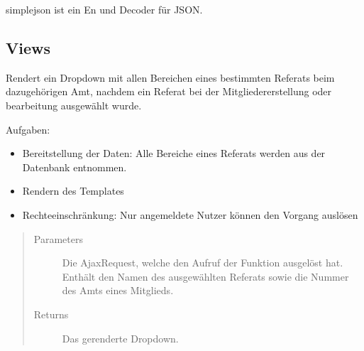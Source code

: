 \documentclass[letterpaper,10pt,english]{sphinxmanual}
\begin{document}
simplejson ist ein En\sphinxhyphen{} und Decoder für JSON.


\subsection{Views}
\label{\detokenize{masterCodeDoc:id6}}\label{\detokenize{masterCodeDoc:module-mitglieder.views}}

\begin{fulllineitems}
\label{\detokenize{masterCodeDoc:mitglieder.views.bereiche_laden}}
Rendert ein Dropdown mit allen Bereichen eines bestimmten Referats beim dazugehörigen Amt, nachdem ein Referat bei der Mitgliedererstellung oder \sphinxhyphen{}bearbeitung ausgewählt wurde.

Aufgaben:
\begin{itemize}
\item {} 
Bereitstellung der Daten: Alle Bereiche eines Referats werden aus der Datenbank entnommen.

\item {} 
Rendern des Templates

\item {} 
Rechteeinschränkung: Nur angemeldete Nutzer können den Vorgang auslösen

\end{itemize}
\begin{quote}\begin{description}
\item[{Parameters}] \leavevmode
{} \textendash{} Die Ajax\sphinxhyphen{}Request, welche den Aufruf der Funktion ausgelöst hat. Enthält den Namen des ausgewählten Referats sowie die Nummer des Amts eines Mitglieds.

\item[{Returns}] \leavevmode
Das gerenderte Dropdown.

\end{description}\end{quote}

\end{fulllineitems}
\end{document}
